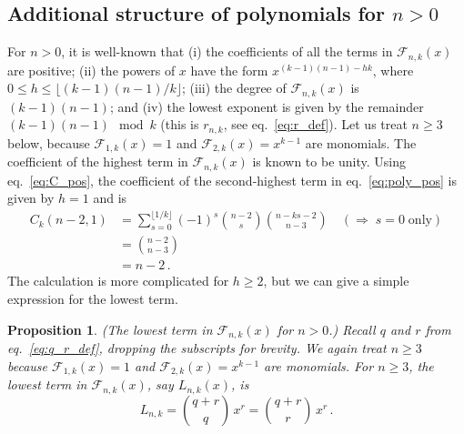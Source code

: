 \documentclass[review]{elsarticle}
\theoremstyle{plain}
\newtheorem{proposition}[theorem]{Proposition}
\begin{document}
\subsection{Additional structure of polynomials for $n>0$}\label{sec:poly_pos}
For $n>0$, it is well-known that
(i) the coefficients of all the terms in $\mathcal{F}_{n,k}(x)$ are positive;
(ii) the powers of $x$ have the form $x^{(k-1)(n-1)-hk}$, where $0\le h\le \lfloor(k-1)(n-1)/k\rfloor$;
(iii) the degree of $\mathcal{F}_{n,k}(x)$ is $(k-1)(n-1)$; and
(iv) the lowest exponent is given by the remainder $(k-1)(n-1)\!\!\!\mod k$
(this is $r_{n,k}$, see eq.~\eqref{eq:r_def}).
Let us treat $n\ge3$ below, because $\mathcal{F}_{1,k}(x)=1$ and $\mathcal{F}_{2,k}(x)=x^{k-1}$ are monomials.
The coefficient of the highest term in $\mathcal{F}_{n,k}(x)$ is known to be unity.
Using eq.~\eqref{eq:C_pos}, the coefficient of the second-highest term in eq.~\eqref{eq:poly_pos} is given by $h=1$ and is 
\begin{equation}
\label{eq:Cnk1_pos}
\begin{split}
C_k(n-2,1) &= \sum_{s=0}^{\lfloor 1/k \rfloor} (-1)^s\binom{n-2}{s} \binom{n-ks-2}{n-3} \quad (\Rightarrow\;s=0\;\textrm{only})
\\
&= \binom{n-2}{n-3}
\\
&= n-2 \,.
\end{split}
\end{equation}
The calculation is more complicated for $h\ge2$, but we can give a simple expression for the lowest term.
\begin{proposition}\label{prop:low_pos}
(The lowest term in $\mathcal{F}_{n,k}(x)$ for $n>0$.)
Recall $q$ and $r$ from eq.~\eqref{eq:q_r_def}, dropping the subscripts for brevity.
We again treat $n\ge3$ because $\mathcal{F}_{1,k}(x)=1$ and $\mathcal{F}_{2,k}(x)=x^{k-1}$ are monomials.
For $n\ge3$, the lowest term in $\mathcal{F}_{n,k}(x)$, say $L_{n,k}(x)$, is
\begin{equation}  
\label{eq:low_pos}
L_{n,k} = \binom{q+r}{q}\,x^r = \binom{q+r}{r}\,x^r \,.
\end{equation}
\end{proposition}
\end{document}
